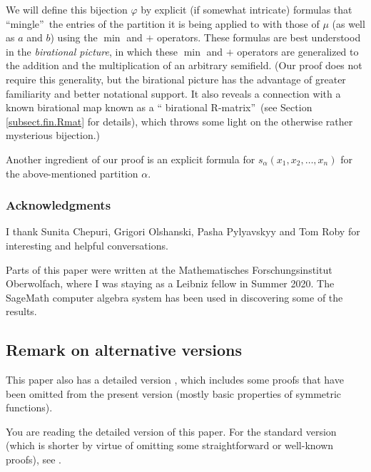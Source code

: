\documentclass[numbers=enddot,12pt,final,onecolumn,notitlepage]{scrartcl}%
\theoremstyle{definition}
\newenvironment{verlong}{}{}
\newenvironment{vershort}{}{}
\begin{document}
We will define this bijection $\varphi$ by explicit (if somewhat intricate)
formulas that \textquotedblleft mingle\textquotedblright\ the entries of the
partition it is being applied to with those of $\mu$ (as well as $a$ and $b$)
using the $\min$ and $+$ operators. These formulas are best understood in the
\textit{birational picture}, in which these $\min$ and $+$ operators are
generalized to the addition and the multiplication of an arbitrary semifield.
(Our proof does not require this generality, but the birational picture has
the advantage of greater familiarity and better notational support. It also
reveals a connection with  a known birational map known as a \textquotedblleft
birational R-matrix\textquotedblright\ (see Section \ref{subsect.fin.Rmat} for
details), which throws some light on the otherwise rather mysterious bijection.)

Another ingredient of our proof is an explicit formula for $s_{\alpha}\left(
x_{1},x_{2},\ldots,x_{n}\right)  $ for the above-mentioned partition $\alpha$.

\subsubsection*{Acknowledgments}

I thank Sunita Chepuri, Grigori Olshanski, Pasha Pylyavskyy and Tom Roby for
interesting and helpful conversations.

Parts of this paper were written at the Mathematisches Forschungsinstitut
Oberwolfach, where I was staying as a Leibniz fellow in Summer 2020. The
SageMath computer algebra system \cite{SageMath} has been used in discovering
some of the results.

\subsection*{Remark on alternative versions}

\begin{vershort}
This paper also has a detailed version \cite{verlong}, which includes some
proofs that have been omitted from the present version (mostly basic
properties of symmetric functions).
\end{vershort}

\begin{verlong}
You are reading the detailed version of this paper. For the standard version
(which is shorter by virtue of omitting some straightforward or well-known
proofs), see \cite{vershort}.
\end{verlong}
\end{document}
